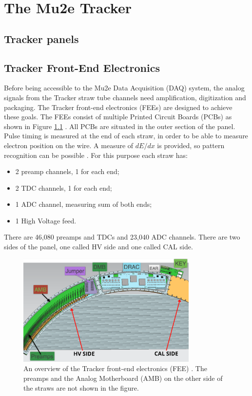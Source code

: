 \chapter{The Mu2e Tracker}\label{chaptertrk}
\section{Tracker panels}
\section{Tracker Front-End Electronics}
Before being accessible to the Mu2e Data Acquisition (DAQ) system, the analog signals from the Tracker straw tube channels need amplification, digitization and packaging. The Tracker front-end electronics (FEEs) are designed to achieve these goals. The FEEs consist of multiple Printed Circuit Boards (PCBs) as shown in Figure \ref{fig:trackerfee} \cite{vadimmu2e}.
All PCBs are situated in the outer section of the panel. Pulse timing is measured at the end of each straw, in order to be able to measure electron position on the wire. A measure of $dE/dx$ is provided, so pattern recognition can be possible \cite{bartoszek2015mu2e}. For this purpose each straw has:
\begin{itemize}
    \item 2 preamp channels, 1 for each end;
    \item 2 TDC channels, 1 for each end;
    \item 1 ADC channel, measuring sum of both ends;
    \item 1 High Voltage feed.
\end{itemize}
There are 46,080 preamps and TDCs and 23,040 ADC channels. There are two sides of the panel, one called HV side and one called CAL side. 
\begin{figure}[!h]
\centering
\includegraphics[width =0.8\textwidth]{figures/png/Screenshot_20240131_111836.png}
\caption{An overview of the Tracker front-end electronics (FEE) \cite{vadimmu2e}. The preamps and the Analog Motherboard (AMB) on the other side of the straws are not shown in the figure.}
\label{fig:trackerfee}
\end{figure}
